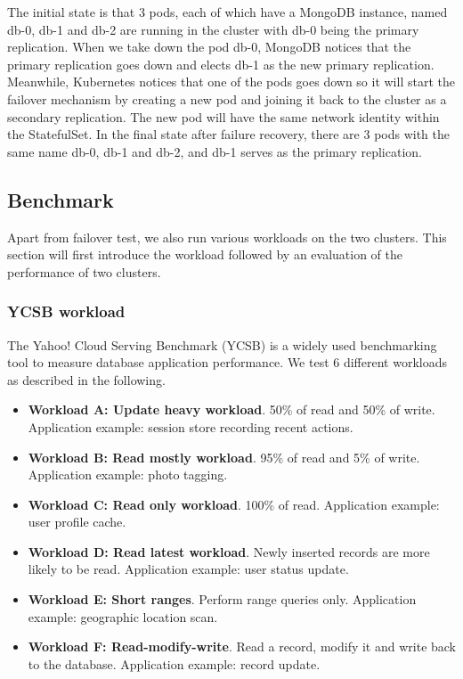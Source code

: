 \documentclass[sigconf]{acmart}
\begin{document}
The initial state is that 3 pods, each of which have a MongoDB instance, named db-0, db-1 and db-2 are running in the cluster with db-0 being the primary replication. When we take down the pod db-0, MongoDB notices that the primary replication goes down and elects db-1 as the new primary replication. Meanwhile, Kubernetes notices that one of the pods goes down so it will start the failover mechanism by creating a new pod and joining it back to the cluster as a secondary replication. The new pod will have the same network identity within the StatefulSet. In the final state after failure recovery, there are 3 pods with the same name db-0, db-1 and db-2, and db-1 serves as the primary replication. 

\subsection{Benchmark}
Apart from failover test, we also run various workloads on the two clusters. This section will first introduce the workload followed by an evaluation of the performance of two clusters.

\subsubsection{YCSB workload}
The Yahoo! Cloud Serving Benchmark (YCSB) \cite{ycsb} is a widely used benchmarking tool to measure database application performance. We test 6 different workloads as described in the following.
\begin{itemize}
    \item \textbf{Workload A: Update heavy workload}. 50\% of read and 50\% of write. Application example: session store recording recent actions.
    \item \textbf{Workload B: Read mostly workload}. 95\% of read and 5\% of write. Application example: photo tagging.
    \item \textbf{Workload C: Read only workload}. 100\% of read. Application example: user profile cache.
    \item \textbf{Workload D: Read latest workload}. Newly inserted records are more likely to be read. Application example: user status update.
    \item \textbf{Workload E: Short ranges}. Perform range queries only. Application example: geographic location scan.
    \item \textbf{Workload F: Read-modify-write}. Read a record, modify it and write back to the database. Application example: record update.
\end{itemize}
\end{document}

